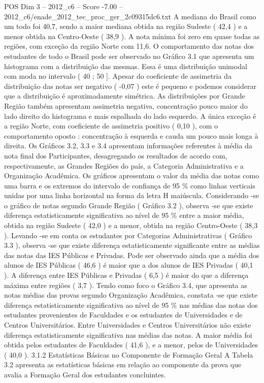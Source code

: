 \begin{textsample}{POS Dim 3 – 2012\_c6 – Score -7.00 – 2012\_c6/enade\_2012\_tec\_proc\_ger\_2c09315dc6.txt}
A mediana do Brasil como um todo foi 40,7, sendo a maior mediana obtida na região Sudeste ( 42,4 ) e a menor obtida na Centro-Oeste ( 38,9 ).
A nota mínima foi zero em quase todas as regiões, com exceção da região Norte com 11,6.
O comportamento das notas dos estudantes de todo o Brasil pode ser observado no Gráfico 3.1 que apresenta um histograma com a distribuição das mesmas.
Essa é uma distribuição unimodal com moda no intervalo ( 40 ; 50 ].
Apesar do coeficiente de assimetria da distribuição das notas ser negativo ( -0,07 ) este é pequeno e podemos considerar que a distribuição é aproximadamente simétrica.
As distribuições por Grande Região também apresentam assimetria negativa, concentração pouco maior do lado direito do histograma e mais espalhada do lado esquerdo.
A única exceção é a região Norte, com coeficiente de assimetria positivo ( 0,10 ), com o comportamento oposto : concentração à esquerda e cauda um pouco mais longa à direita.
Os Gráficos 3.2, 3.3 e 3.4 apresentam informações referentes à média da nota final dos Participantes, desagregando os resultados de acordo com, respectivamente, as Grandes Regiões do país, a Categoria Administrativa e a Organização Acadêmica.
Os gráficos apresentam o valor da média das notas como uma barra e os extremos do intervalo de confiança de 95 \% como linhas verticais unidas por uma linha horizontal na forma da letra H maiúscula.
Considerando -se o gráfico de notas segundo Grande Região ( Gráfico 3.2 ), observa -se que existe diferença estatisticamente significativa ao nível de 95 \% entre a maior média, obtida na região Sudeste ( 42,0 ) e a menor, obtida na região Centro-Oeste ( 38,3 ).
Levando -se em conta os estudantes por Categorias Administrativas ( Gráfico 3.3 ), observa -se que existe diferença estatisticamente significante entre as médias das notas das IES Públicas e Privadas.
Pode ser observado ainda que a média dos alunos de IES Públicas ( 46,6 ) é maior que a dos alunos de IES Privadas ( 40,1 ).
A diferença entre IES Públicas e Privadas ( 6,5 ) é maior do que a diferença máxima entre regiões ( 3,7 ).
Tendo como foco o Gráfico 3.4, que apresenta as notas médias das provas segundo Organização Acadêmica, constata -se que existe diferença estatisticamente significativa ao nível de 95 \% nas médias das notas dos estudantes provenientes de Faculdades e os estudantes de Universidades e de Centros Universitários.
Entre Universidades e Centros Universitários não existe diferença estatisticamente significativa nas médias das notas.
A maior média foi obtida pelos estudantes de Faculdades ( 41,6 ), e a menor, pelos de Universidades ( 40,0 ). 3.1.2 Estatísticas Básicas no Componente de Formação Geral A Tabela 3.2 apresenta as estatísticas básicas em relação ao componente da prova que avalia a Formação Geral dos estudantes concluintes.

\end{textsample}
